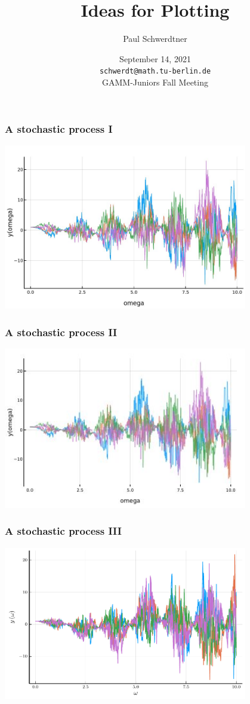 \documentclass[aspectratio=169]{beamer}
\title{Ideas for Plotting}
\author{Paul Schwerdtner}
\date{September 14, 2021 \\\vspace{1cm} \texttt{schwerdt@math.tu-berlin.de} \\\vspace{1cm} GAMM-Juniors Fall Meeting}
\begin{document}
\begin{frame}[plain] %
  \addtocounter{framenumber}{-1}
  \maketitle
\end{frame}

\begin{frame} %
    \frametitle{A stochastic process I}
    \centering
    \includegraphics[width=0.8\textwidth]{./PlotSources/terrible.jpg}
\end{frame}

\begin{frame} %
    \frametitle{A stochastic process II}
    \centering
    \includegraphics[width=0.8\textwidth]{./PlotSources/more_terrible.jpg}
\end{frame}

\begin{frame} %
    \frametitle{A stochastic process III}
    \centering
    \includegraphics[width=0.8\textwidth]{./PlotSources/less_terrible.pdf}
\end{frame}
\end{document}

